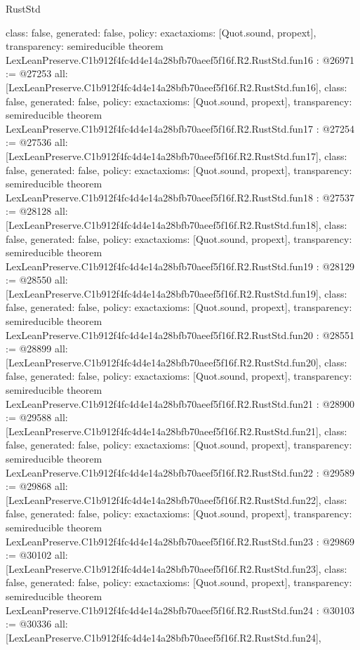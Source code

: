 \begin{lexlean}{RustStd}
\begin{coremodule}
{  class: false,
  generated: false,
  policy: exact{axioms: [Quot.sound, propext]},
  transparency: semireducible
}
theorem LexLeanPreserve.C1b912f4fc4d4e14a28bfb70aeef5f16f.R2.RustStd.fun16 : @26971 := @27253 {
  all: [LexLeanPreserve.C1b912f4fc4d4e14a28bfb70aeef5f16f.R2.RustStd.fun16],
  class: false,
  generated: false,
  policy: exact{axioms: [Quot.sound, propext]},
  transparency: semireducible
}
theorem LexLeanPreserve.C1b912f4fc4d4e14a28bfb70aeef5f16f.R2.RustStd.fun17 : @27254 := @27536 {
  all: [LexLeanPreserve.C1b912f4fc4d4e14a28bfb70aeef5f16f.R2.RustStd.fun17],
  class: false,
  generated: false,
  policy: exact{axioms: [Quot.sound, propext]},
  transparency: semireducible
}
theorem LexLeanPreserve.C1b912f4fc4d4e14a28bfb70aeef5f16f.R2.RustStd.fun18 : @27537 := @28128 {
  all: [LexLeanPreserve.C1b912f4fc4d4e14a28bfb70aeef5f16f.R2.RustStd.fun18],
  class: false,
  generated: false,
  policy: exact{axioms: [Quot.sound, propext]},
  transparency: semireducible
}
theorem LexLeanPreserve.C1b912f4fc4d4e14a28bfb70aeef5f16f.R2.RustStd.fun19 : @28129 := @28550 {
  all: [LexLeanPreserve.C1b912f4fc4d4e14a28bfb70aeef5f16f.R2.RustStd.fun19],
  class: false,
  generated: false,
  policy: exact{axioms: [Quot.sound, propext]},
  transparency: semireducible
}
theorem LexLeanPreserve.C1b912f4fc4d4e14a28bfb70aeef5f16f.R2.RustStd.fun20 : @28551 := @28899 {
  all: [LexLeanPreserve.C1b912f4fc4d4e14a28bfb70aeef5f16f.R2.RustStd.fun20],
  class: false,
  generated: false,
  policy: exact{axioms: [Quot.sound, propext]},
  transparency: semireducible
}
theorem LexLeanPreserve.C1b912f4fc4d4e14a28bfb70aeef5f16f.R2.RustStd.fun21 : @28900 := @29588 {
  all: [LexLeanPreserve.C1b912f4fc4d4e14a28bfb70aeef5f16f.R2.RustStd.fun21],
  class: false,
  generated: false,
  policy: exact{axioms: [Quot.sound, propext]},
  transparency: semireducible
}
theorem LexLeanPreserve.C1b912f4fc4d4e14a28bfb70aeef5f16f.R2.RustStd.fun22 : @29589 := @29868 {
  all: [LexLeanPreserve.C1b912f4fc4d4e14a28bfb70aeef5f16f.R2.RustStd.fun22],
  class: false,
  generated: false,
  policy: exact{axioms: [Quot.sound, propext]},
  transparency: semireducible
}
theorem LexLeanPreserve.C1b912f4fc4d4e14a28bfb70aeef5f16f.R2.RustStd.fun23 : @29869 := @30102 {
  all: [LexLeanPreserve.C1b912f4fc4d4e14a28bfb70aeef5f16f.R2.RustStd.fun23],
  class: false,
  generated: false,
  policy: exact{axioms: [Quot.sound, propext]},
  transparency: semireducible
}
theorem LexLeanPreserve.C1b912f4fc4d4e14a28bfb70aeef5f16f.R2.RustStd.fun24 : @30103 := @30336 {
  all: [LexLeanPreserve.C1b912f4fc4d4e14a28bfb70aeef5f16f.R2.RustStd.fun24],
}
\end{coremodule}
\end{lexlean}
